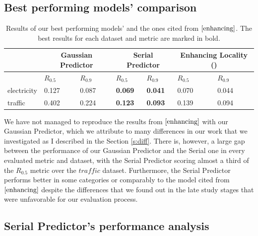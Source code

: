 \documentclass[en]{pracamgr}
\begin{document}
\subsection*{Best performing models' comparison}

\begin{table}[h]
\begin{center}
\begin{tabular}
	{ |p{2cm}|p{1.5cm}|p{1.5cm}||p{1.5cm}|p{1.5cm}||p{1.5cm}|p{1.5cm}|  }
	\hline
	& \multicolumn{2}{c||}{Gaussian Predictor} & \multicolumn{2}{|c||}{Serial Predictor} & \multicolumn{2}{|c|}{Enhancing Locality (\cite{enhancing})} \\
	\hline
	& \hfil $R_{0.5}$ & \hfil $R_{0.9}$ & \hfil $R_{0.5}$ & \hfil $R_{0.9}$
	& \hfil $R_{0.5}$ & \hfil $R_{0.9}$
	 \\
	\hline
	electricity & \hfil 0.127   & \hfil 0.087    & \textbf{\hfil 0.069} &   \hfil \textbf{0.041} & \hfil 0.070 & \hfil 0.044 \\
	traffic &  \hfil 0.402   & \hfil 0.224   & \textbf{\hfil 0.123} &   \hfil \textbf{0.093} & \hfil 0.139 & \hfil 0.094\\
	\hline
\end{tabular}
\caption{\label{tab:results}Results of our best performing models' and the ones cited from $\cite{enhancing}$. The best results for each dataset and metric are marked in bold.}
\end{center}
\end{table}


We have not managed to reproduce the results from $\cite{enhancing}$ with our Gaussian Predictor, which we attribute to many differences in our work that we investigated as I described in the Section \ref{s:diff}. There is, however, a large gap between the performance of our Gaussian Predictor and the Serial one in every evaluated metric and dataset, with the Serial Predictor scoring almost a third of the $R_{0.5}$ metric over the $traffic$ dataset. Furthermore, the Serial Predictor performs better in some categories or comparably to the model cited from $\cite{enhancing}$ despite the differences that we found out in the late study stages that were unfavorable for our evaluation process.

\subsection*{Serial Predictor's performance analysis}
\end{document}
